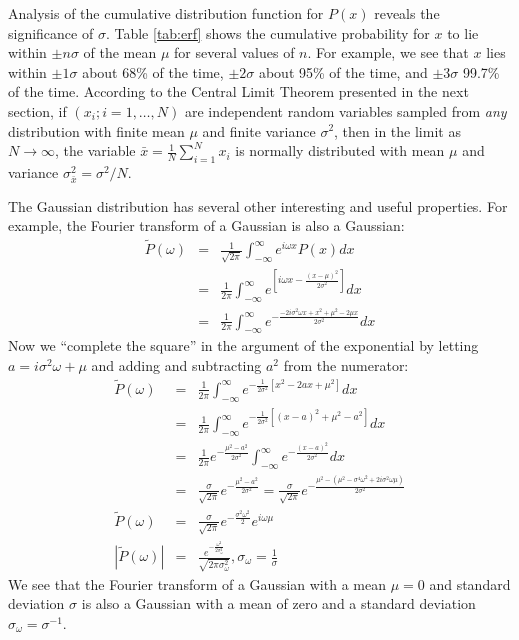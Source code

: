 \documentclass{revtex4}
\begin{document}
Analysis of the cumulative distribution function for $P(x)$ reveals the significance of $\sigma$. Table \ref{tab:erf} shows the cumulative probability for $x$ to lie within $\pm n\sigma$ of the mean $\mu$ for several values of $n$. For example, we see that $x$ lies within $\pm 1\sigma$ about 68\% of the time, $\pm 2\sigma$ about 95\% of the time, and $\pm 3\sigma$ 99.7\% of the time. According to the Central Limit Theorem presented in the next section, if $(x_i; i=1,\ldots,N)$ are
independent random variables sampled from \emph{any} distribution with finite mean $\mu$ and finite
variance $\sigma^2$, then in the limit as $N \rightarrow \infty$, the
variable $\bar{x} = \frac{1}{N} \sum_{i=1}^N x_i$ is normally
distributed with mean $\mu$ and variance $\sigma_{\bar{x}}^2 =
\sigma^2/N$. 

The Gaussian distribution has several other interesting and useful
properties. For example, the Fourier transform of a Gaussian is also a
Gaussian:
\begin{eqnarray}
  \tilde P(\omega) &=& \frac{1}{\sqrt{2\pi}} \int_{-\infty}^{\infty} e^{i \omega
    x} P(x) dx \nonumber \\
  &=& \frac{1}{2\pi}\int_{-\infty}^\infty
  e^{\left[i\omega x - \frac{(x-\mu)^2}{2\sigma^2}\right]} dx   \nonumber \\
  &=& \frac{1}{2\pi}\int_{-\infty}^\infty
  e^{-\frac{-2i\sigma^2 \omega x + x^2 + \mu^2 - 2\mu x
      }{2\sigma^2}} dx
\end{eqnarray}
Now we ``complete the square'' in the argument of the exponential by
letting $a = i\sigma^2 \omega + \mu$ and adding and subtracting $a^2$
from the numerator:
\begin{eqnarray}
  \tilde{P}(\omega) &=& \frac{1}{2\pi}
  \int_{-\infty}^\infty e^{-\frac{1}{2\sigma^2}\left[x^2 -2ax +
      \mu^2\right]} dx \nonumber \\
  &=& \frac{1}{2\pi}
  \int_{-\infty}^\infty e^{-\frac{1}{2\sigma^2} \left[(x-a)^2 + \mu^2
      - a^2 \right]} dx \nonumber \\
  &=& \frac{1}{2\pi}
  e^{-\frac{\mu^2 - a^2}{2\sigma^2}} \int_{-\infty}^\infty
  e^{-\frac{(x-a)^2}{2\sigma^2}} dx \nonumber \\
  &=& \frac{\sigma}{\sqrt{2\pi}} e^{-\frac{\mu^2 - a^2}{2\sigma^2}} = \frac{\sigma}{\sqrt{2\pi}}
  e^{-\frac{\mu^2-(\mu^2 - \sigma^4 \omega^2 + 2i\sigma^2
      \omega \mu)}{2\sigma^2}} \nonumber \\
 \tilde{P}(\omega) &=& \frac{\sigma}{\sqrt{2\pi}} e^{-\frac{\sigma^2 \omega^2}{2}}e^{ i
   \omega \mu} \nonumber \\
 \left|\tilde{P}(\omega) \right| &=&
 \frac{e^{-\frac{\omega^2}{2\sigma_\omega^2}}}{\sqrt{2\pi
     \sigma^2_\omega}}, \sigma_\omega = \frac{1}{\sigma}
 \nonumber 
\end{eqnarray}
We see that the Fourier transform of a Gaussian with a mean $\mu=0$
and standard deviation $\sigma$ is also a Gaussian with a mean of zero
and a standard deviation $\sigma_\omega = \sigma^{-1}$.
\end{document}
